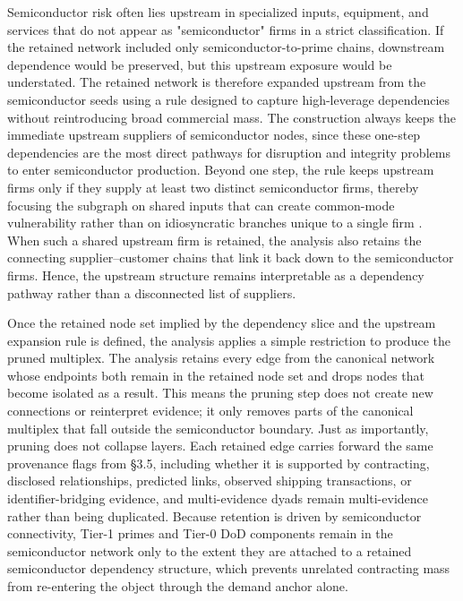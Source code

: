 Semiconductor risk often lies upstream in specialized inputs, equipment, and services that do not appear as "semiconductor" firms in a strict classification. If the retained network included only semiconductor-to-prime chains, downstream dependence would be preserved, but this upstream exposure would be understated. The retained network is therefore expanded upstream from the semiconductor seeds using a rule designed to capture high-leverage dependencies without reintroducing broad commercial mass. The construction always keeps the immediate upstream suppliers of semiconductor nodes, since these one-step dependencies are the most direct pathways for disruption and integrity problems to enter semiconductor production. Beyond one step, the rule keeps upstream firms only if they supply at least two distinct semiconductor firms, thereby focusing the subgraph on shared inputs that can create common-mode vulnerability rather than on idiosyncratic branches unique to a single firm \parencite{craighead_severity_2007}. When such a shared upstream firm is retained, the analysis also retains the connecting supplier--customer chains that link it back down to the semiconductor firms. Hence, the upstream structure remains interpretable as a dependency pathway rather than a disconnected list of suppliers.

Once the retained node set implied by the dependency slice and the upstream expansion rule is defined, the analysis applies a simple restriction to produce the pruned multiplex. The analysis retains every edge from the canonical network whose endpoints both remain in the retained node set and drops nodes that become isolated as a result. This means the pruning step does not create new connections or reinterpret evidence; it only removes parts of the canonical multiplex that fall outside the semiconductor boundary. Just as importantly, pruning does not collapse layers. Each retained edge carries forward the same provenance flags from \S3.5, including whether it is supported by contracting, disclosed relationships, predicted links, observed shipping transactions, or identifier-bridging evidence, and multi-evidence dyads remain multi-evidence rather than being duplicated. Because retention is driven by semiconductor connectivity, Tier-1 primes and Tier-0 DoD components remain in the semiconductor network only to the extent they are attached to a retained semiconductor dependency structure, which prevents unrelated contracting mass from re-entering the object through the demand anchor alone.

